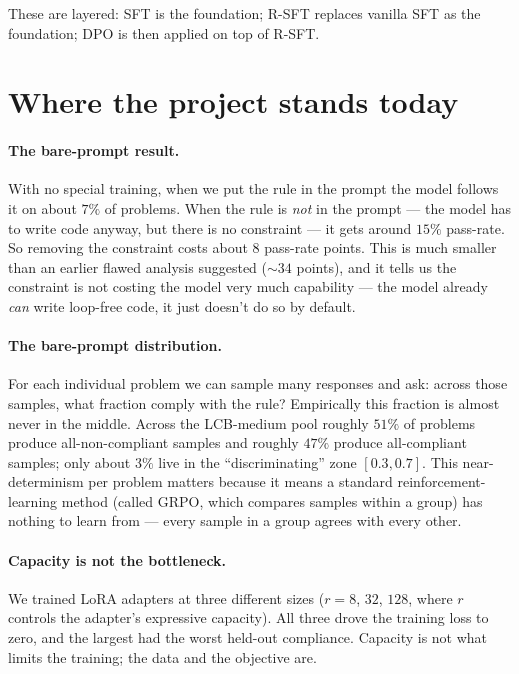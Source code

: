 \documentclass[11pt]{article}
\begin{document}
These are layered: SFT is the foundation; R-SFT replaces vanilla SFT as the
foundation; DPO is then applied on top of R-SFT.

\section{Where the project stands today}
\label{sec:state}

\paragraph{The bare-prompt result.}
With no special training, when we put the rule in the prompt the model
follows it on about $7\%$ of problems. When the rule is \emph{not} in the
prompt --- the model has to write code anyway, but there is no constraint
--- it gets around $15\%$ pass-rate. So removing the constraint costs about
$8$ pass-rate points. This is much smaller than an earlier flawed analysis
suggested ($\sim\! 34$ points), and it tells us the constraint is not
costing the model very much capability --- the model already \emph{can}
write loop-free code, it just doesn't do so by default.

\paragraph{The bare-prompt distribution.}
For each individual problem we can sample many responses and ask: across
those samples, what fraction comply with the rule? Empirically this fraction
is almost never in the middle. Across the LCB-medium pool roughly $51\%$ of
problems produce all-non-compliant samples and roughly $47\%$ produce
all-compliant samples; only about $3\%$ live in the ``discriminating'' zone
$[0.3, 0.7]$. This near-determinism per problem matters because it means a
standard reinforcement-learning method (called GRPO, which compares samples
within a group) has nothing to learn from --- every sample in a group agrees
with every other.

\paragraph{Capacity is not the bottleneck.}
We trained LoRA adapters at three different sizes ($r=8$, $32$, $128$, where
$r$ controls the adapter's expressive capacity). All three drove the
training loss to zero, and the largest had the worst held-out compliance.
Capacity is not what limits the training; the data and the objective are.
\end{document}
